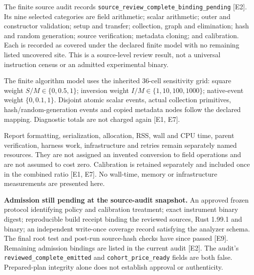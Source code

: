 \documentclass[11pt]{article}
\begin{document}
The finite source audit records \texttt{source\_review\_complete\_binding\_pending} [E2]. Its nine selected categories are field arithmetic; scalar arithmetic; outer and constructor validation; setup and transfer; collection, graph and elimination; hash and random generation; source verification; metadata cloning; and calibration. Each is recorded as covered under the declared finite model with no remaining listed uncovered site. This is a source-level review result, not a universal instruction census or an admitted experimental binary.

The finite algorithm model uses the inherited 36-cell sensitivity grid: square weight $S/M\in\{0,0.5,1\}$; inversion weight $I/M\in\{1,10,100,1000\}$; native-event weight $\{0,0.1,1\}$. Disjoint atomic scalar events, actual collection primitives, hash/random-generation events and copied metadata nodes follow the declared mapping. Diagnostic totals are not charged again [E1, E7].

Report formatting, serialization, allocation, RSS, wall and CPU time, parent verification, harness work, infrastructure and retries remain separately named resources. They are not assigned an invented conversion to field operations and are not assumed to cost zero. Calibration is retained separately and included once in the combined ratio [E1, E7]. No wall-time, memory or infrastructure measurements are presented here.

\textbf{Admission still pending at the source-audit snapshot.} An approved frozen protocol identifying policy and calibration treatment; exact instrument binary digest; reproducible build receipt binding the reviewed sources, Rust 1.99.1 and binary; an independent write-once coverage record satisfying the analyzer schema. The final root test and post-run source-hash checks have since passed [E9]. Remaining admission bindings are listed in the current audit [E2]. The audit's \texttt{reviewed\_complete\_emitted} and \texttt{cohort\_price\_ready} fields are both false. Prepared-plan integrity alone does not establish approval or authenticity.
\end{document}
